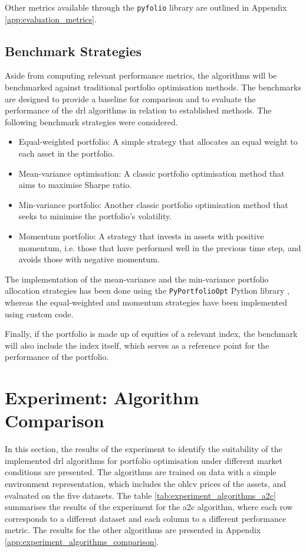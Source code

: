 Other metrics available through the \texttt{pyfolio} library are outlined in Appendix \ref{app:evaluation_metrics}.

\subsection{Benchmark Strategies} \label{sec:benchmark-strategies}

Aside from computing relevant performance metrics, the algorithms will be benchmarked against traditional portfolio optimisation methods. The benchmarks are designed to provide a baseline for comparison and to evaluate the performance of the \acrshort{drl} algorithms in relation to established methods. The following benchmark strategies were considered.
\begin{itemize}
    \item Equal-weighted portfolio: A simple strategy that allocates an equal weight to each asset in the portfolio.
    \item Mean-variance optimisation: A classic portfolio optimisation method that aims to maximise Sharpe ratio.
    \item Min-variance portfolio: Another classic portfolio optimisation method that seeks to minimise the portfolio's volatility.
    \item Momentum portfolio: A strategy that invests in assets with positive momentum, i.e. those that have performed well in the previous time step, and avoids those with negative momentum.
\end{itemize}

The implementation of the mean-variance and the min-variance portfolio allocation strategies has been done using the \texttt{PyPortfolioOpt} Python library \cite{Martin2021}, whereas the equal-weighted and momentum strategies have been implemented using custom code.

Finally, if the portfolio is made up of equities of a relevant index, the benchmark will also include the index itself, which serves as a reference point for the performance of the portfolio. 

\section{Experiment: Algorithm Comparison} \label{sec:exp-algorithm-comparison}

In this section, the results of the experiment to identify the suitability of the implemented \acrshort{drl} algorithms for portfolio optimisation under different market conditions are presented. The algorithms are trained on data with a simple environment representation, which includes the \acrshort{ohlcv} prices of the assets, and evaluated on the five datasets. The table \ref{tab:experiment_algorithms_a2c} summarises the results of the experiment for the \acrshort{a2c} algorithm, where each row corresponds to a different dataset and each column to a different performance metric. The results for the other algorithms are presented in Appendix \ref{app:experiment_algorithms_comparison}.

